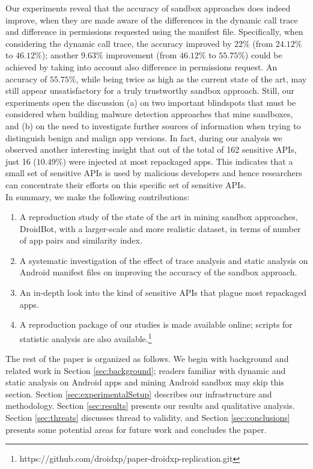 Our experiments reveal that the accuracy of sandbox approaches does indeed improve, when they are made aware of the differences in the dynamic call trace and difference in permissions requested using the manifest file. Specifically, when considering the dynamic call trace, the accuracy improved by $22\%$ (from $24.12\%$ to $46.12\%$); another $9.63\%$ improvement (from $46.12\%$ to $55.75\%$) could be achieved by taking into account also difference in permissions request. An accuracy of $55.75\%$, while being twice as high as the current state of the art, may still appear unsatisfactory for a truly trustworthy sandbox approach. Still, 
our experiments open the discussion (a) on two important blindspots that must be considered when building 
malware detection approaches that mine sandboxes, and (b) on the need to investigate further sources of information when trying to distinguish benign and malign app versions. 
In fact, during our analysis we observed another interesting insight that out of the total of 162 sensitive 
APIs, just 16 ($10.49$\%) were injected at most repackaged apps. 
This indicates that a small set of sensitive APIs is used by malicious developers and hence 
researchers can concentrate their efforts on this specific set of sensitive APIs.\\


\noindent
In summary, we make the following contributions:

\begin{enumerate}[1.]
\item A reproduction study of the state of the art in mining sandbox approaches, DroidBot, 
with a larger-scale and more realistic dataset, in terms of number of app pairs and similarity index.
\item A systematic investigation of the effect of trace analysis and static analysis on Android manifest files 
on improving the accuracy of the sandbox approach.
\item An in-depth look into the kind of sensitive APIs that plague most repackaged apps.
\item A reproduction package of our studies is made available online; scripts for statistic analysis are also available.\footnote{https://github.com/droidxp/paper-droidxp-replication.git}
\end{enumerate}


The rest of the paper is organized as follows. We begin with background and related work in Section \ref{sec:background};
readers familiar with dynamic and static analysis on Android apps and mining Android sandbox may skip this section.
Section \ref{sec:experimentalSetup} describes our infrastructure and methodology. Section \ref{sec:results} presents our results and qualitative analysis. Section \ref{sec:threats} discusses thread to validity, and Section \ref{sec:conclusions} 
presents some potential areas for future work and concludes the paper.




